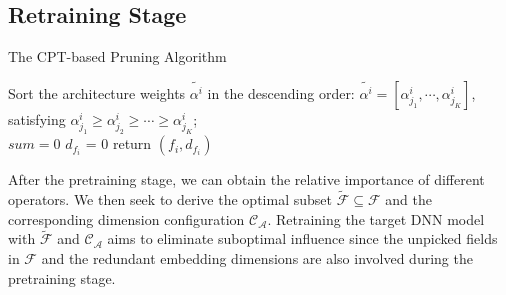 \documentclass[10pt,journal,compsoc]{IEEEtran}
\begin{document}
\subsection{Retraining Stage}
\begin{algorithm}[t]
\caption{The CPT-based Pruning Algorithm}
\label{algo:our-method}
\SetAlgoLined
{}
Sort the architecture weights $\widetilde{\alpha^i}$ in the descending order: $\widetilde{\alpha^i} =  [\alpha^i_{j_1}, \cdots, \alpha^i_{j_K}]$, satisfying $\alpha^i_{j_1} \ge \alpha^i_{j_2} \ge \cdots \ge \alpha^{i}_{j_K}$;\\
$sum = 0$  
${d}_{f_i}$ = 0 
return $(f_i, {d}_{f_i})$\\
\end{algorithm}

After the {pretraining stage}, we can obtain the relative importance of different operators. We then seek to derive the optimal subset $ \widetilde{\mathcal{F}} \subseteq \mathcal{F}$ and the corresponding dimension configuration $\mathcal{C}_\mathcal{A}$.
Retraining the target DNN model with $\widetilde{\mathcal{F}}$ and $\mathcal{C}_\mathcal{A}$  aims to eliminate suboptimal influence since the unpicked fields in $\mathcal{F}$ and the redundant embedding dimensions are also involved during the pretraining stage.
\end{document}
